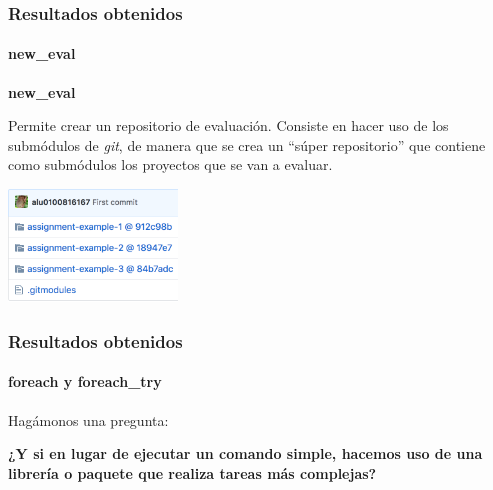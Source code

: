\documentclass{beamer}
\begin{document}
\begin{frame}
  \frametitle{Resultados obtenidos}
  \framesubtitle{new\_eval}
  \textbf{new\_eval}
  \bigskip

  Permite crear un repositorio de evaluación. Consiste en hacer uso de los submódulos de {\it git},
  de manera que se crea un ``súper repositorio'' que contiene como submódulos los proyectos que se van a evaluar.
  \bigskip

  \centering
  \includegraphics[height=3cm, width=4.5cm]{img/eval-preview.png}

\end{frame}


\begin{frame}[fragile]
  \frametitle{Resultados obtenidos}
  \framesubtitle{foreach y foreach\_try}
  
  Hagámonos una pregunta:
  \bigskip

  \textbf{¿Y si en lugar de ejecutar un comando simple, hacemos uso de una librería o paquete que realiza tareas más complejas?}

\end{frame}
\end{document}
